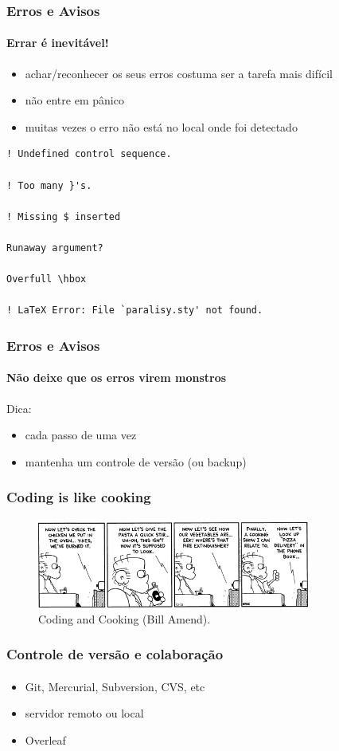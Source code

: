 \begin{frame}[fragile]
\frametitle{Erros e Avisos}
\framesubtitle{Errar é inevitável!}

\begin{itemize}
\item achar/reconhecer os seus erros costuma ser a tarefa mais difícil
\item não entre em pânico
\item muitas vezes o erro não está no local onde foi detectado
\end{itemize}

\begin{verbatim}
! Undefined control sequence.

! Too many }'s.

! Missing $ inserted

Runaway argument?

Overfull \hbox 

! LaTeX Error: File `paralisy.sty' not found.
\end{verbatim}
\end{frame}

\begin{frame}[fragile]
\frametitle{Erros e Avisos}
\framesubtitle{Não deixe que os erros virem monstros}
Dica:
\begin{itemize}
\item cada passo de uma vez
\item mantenha um controle de versão (ou backup)
\end{itemize}
\end{frame}


\begin{frame}[fragile]
\frametitle{Coding is like cooking}
\framesubtitle{}
\begin{figure}[h!]
  \centering
  \label{fig:cooking}
  \includegraphics[width=0.8\textwidth]{figures/cooking.png}
  \caption{Coding and Cooking (Bill Amend).}
\end{figure}

\end{frame}



\begin{frame}[fragile]
\frametitle{Controle de versão e colaboração}
\framesubtitle{}

\begin{itemize}
\item Git, Mercurial, Subversion, CVS, etc
\item servidor remoto ou local
\item Overleaf
\end{itemize}
\end{frame}



